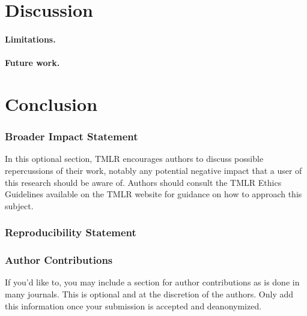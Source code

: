 \documentclass[10pt]{article} %
\theoremstyle{definition}
\theoremstyle{remark}
\begin{document}
\section{Discussion}
\label{sec:discussion}


\paragraph{Limitations.}

\paragraph{Future work.}

\section{Conclusion}
\label{sec:conclusion}


\subsubsection*{Broader Impact Statement}
In this optional section, TMLR encourages authors to discuss possible repercussions of their work,
notably any potential negative impact that a user of this research should be aware of.
Authors should consult the TMLR Ethics Guidelines available on the TMLR website
for guidance on how to approach this subject.

\subsubsection*{Reproducibility Statement}

\subsubsection*{Author Contributions}
If you'd like to, you may include a section for author contributions as is done
in many journals. This is optional and at the discretion of the authors. Only add
this information once your submission is accepted and deanonymized.
\end{document}
